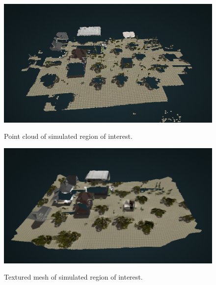 \begin{figure}
	\centering
	\caption[Point cloud of simulated region of interest.]{\small Point cloud of simulated region of interest.} 
	\includegraphics[width=5in]{figures/experiment/simulated-pointcould}
	\label{fig:simulated-pointcloud}
\end{figure}

\begin{figure}
	\centering
	\caption[Textured mesh of simulated region of interest.]{\small Textured mesh of simulated region of interest.} 
	\includegraphics[width=5in]{figures/experiment/textured-simulated}
	\label{fig:textured-map-simulated}
\end{figure}

